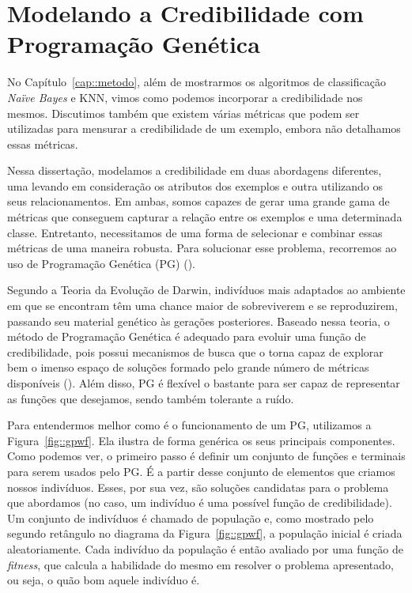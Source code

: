 
\chapter{Modelando a Credibilidade com Programação Genética}
\label{cap::programacao_genetica}

No Capítulo~\ref{cap::metodo},
além de mostrarmos os algoritmos de classificação \textit{Naïve Bayes} e \textsc{KNN}, vimos como podemos incorporar a credibilidade nos mesmos.
Discutimos também que existem várias métricas que podem ser utilizadas para mensurar a credibilidade de um exemplo, 
embora não detalhamos essas métricas.

Nessa dissertação, modelamos a credibilidade em duas abordagens diferentes, uma levando em consideração os atributos dos exemplos e outra utilizando os seus relacionamentos. 
Em ambas, somos capazes de gerar uma grande gama de métricas que conseguem capturar a relação entre os exemplos e uma determinada classe.
Entretanto, necessitamos de uma forma de selecionar e combinar essas métricas de uma maneira robusta. Para solucionar esse problema, recorremos ao uso de Programação Genética (\textsc{PG}) (\cite{Koza92}).

Segundo a Teoria da Evolução de Darwin, indivíduos mais adaptados ao ambiente em que se encontram têm uma chance maior de sobreviverem e se reproduzirem, passando seu material genético às gerações posteriores. Baseado nessa teoria, o método de Programação Genética é adequado para evoluir uma função de credibilidade, pois possui mecanismos de busca que o torna capaz de explorar bem o imenso espaço de soluções formado pelo grande número de métricas disponíveis (\cite{Fogel00}). Além disso, \textsc{PG} é flexível o bastante para ser capaz de representar as funções que desejamos, sendo também tolerante a ruído.

Para entendermos melhor como é o funcionamento de um \textsc{PG}, utilizamos a Figura~\ref{fig::gpwf}. Ela ilustra de forma genérica os seus principais componentes.
Como podemos ver, o primeiro passo é definir um conjunto de funções e terminais para serem usados pelo \textsc{PG}.
É a partir desse conjunto de elementos que criamos nossos indivíduos.
Esses, por sua vez, são soluções candidatas para o problema que abordamos (no caso, um indivíduo é uma possível função de credibilidade).
Um conjunto de indivíduos é chamado de população e, como mostrado pelo segundo retângulo no diagrama da Figura~\ref{fig::gpwf}, a população inicial é criada aleatoriamente. 
Cada indivíduo da população é então avaliado por uma função de \textit{fitness}, que calcula a habilidade do mesmo em resolver o problema apresentado, ou seja, o quão bom aquele indivíduo é.

